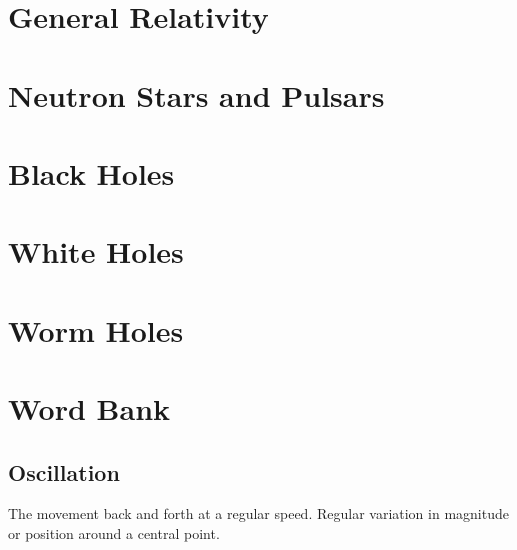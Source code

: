 \documentclass{article}
\begin{document}
\section{General Relativity}\label{sec:generalrelativity}




\section{Neutron Stars and Pulsars}




\section{Black Holes}




\section{White Holes}




\section{Worm Holes}




\section{Word Bank}
\subsection{Oscillation}\label{sec:oscillation}
The movement back and forth at a regular speed. Regular variation in magnitude or position around a central point.
\end{document}
